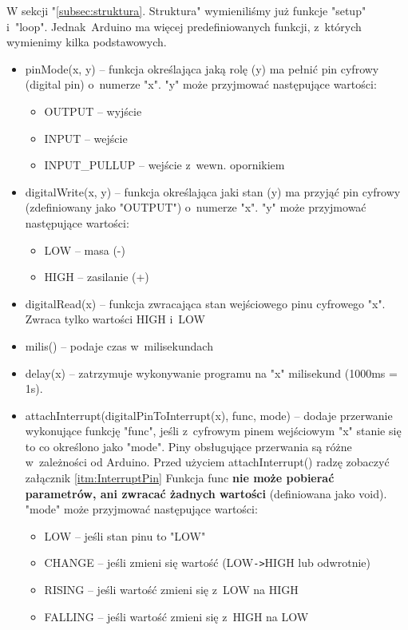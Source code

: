 \documentclass[a4paper,12pt, twoside]{article}
\begin{document}
	W sekcji "\ref{subsec:struktura}. Struktura" wymieniliśmy już funkcje "setup" i~"loop". Jednak~Arduino ma więcej predefiniowanych funkcji, z~których wymienimy kilka podstawowych.
	\begin{itemize}
		\item pinMode(x, y) -- funkcja określająca jaką rolę (y) ma pełnić pin cyfrowy (digital pin) o~numerze "x". "y" może przyjmować następujące wartości:
			\begin{itemize}
				\item OUTPUT -- wyjście
				\item INPUT -- wejście
				\item INPUT\_PULLUP -- wejście z~wewn. opornikiem
			\end{itemize}
		\item digitalWrite(x, y) -- funkcja określająca jaki stan (y) ma przyjąć pin cyfrowy (zdefiniowany jako "OUTPUT") o~numerze "x". "y" może przyjmować następujące wartości:
			\begin{itemize}
				\item LOW -- masa (-)
				\item HIGH -- zasilanie (+)
			\end{itemize}
		\item digitalRead(x) -- funkcja zwracająca stan wejściowego pinu cyfrowego "x". Zwraca tylko wartości HIGH i~LOW
		\item milis() -- podaje czas w~milisekundach
		\item delay(x) -- zatrzymuje wykonywanie programu na "x" milisekund (1000ms = 1s).
		\item attachInterrupt(digitalPinToInterrupt(x), func, mode) -- dodaje przerwanie wykonujące funkcję "func", jeśli z~cyfrowym pinem wejściowym "x" stanie się to co określono jako "mode". Piny obsługujące przerwania są różne w~zależności od Arduino. Przed użyciem attachInterrupt() radzę zobaczyć załącznik \ref{itm:InterruptPin} Funkcja func \textbf{nie może pobierać parametrów, ani zwracać żadnych wartości} (definiowana jako void). "mode" może przyjmować następujące wartości:
			\begin{itemize}
				\item LOW -- jeśli stan pinu to "LOW"
				\item CHANGE -- jeśli zmieni się wartość (LOW\verb|->|HIGH lub odwrotnie)
				\item RISING -- jeśli wartość zmieni się z~LOW na HIGH
				\item FALLING -- jeśli wartość zmieni się z~HIGH na LOW
			\end{itemize}

\end{itemize}
\end{document}

